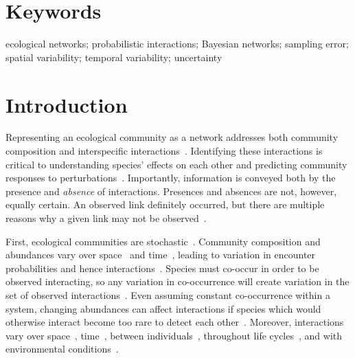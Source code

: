 \documentclass[12pt]{article}
\begin{document}
\begin{spacing}{2.0}
\section*{\small Keywords}

ecological networks; probabilistic interactions; Bayesian networks; sampling error; spatial variability; temporal variability; uncertainty

\linenumbers
\clearpage

\section*{Introduction}

    Representing an ecological community as a network addresses both community composition and interspecific interactions~\citep{Roslin2016}. Identifying these interactions is critical to understanding species' effects on each other and predicting community responses to perturbations~\citep{Bartomeus2016,Giron2018}. Importantly, information is conveyed both by the presence and \emph{absence} of interactions. Presences and absences are not, however, equally certain. An observed link definitely occurred, but there are multiple reasons why a given link may not be observed~\citep{Jordano2016}. 


    First, ecological communities are stochastic~\citep{Gotelli2000}. Community composition and abundances vary over space~\citep{Baiser2012} and time~\citep{Olesen2011a}, leading to variation in encounter probabilities and hence interactions~\citep{Vazquez2005,Poisot2015,Graham2018}. Species must co-occur in order to be observed interacting, so any variation in co-occurrence will create variation in the set of observed interactions~\citep{Gravel2018,Graham2018}. Even assuming constant co-occurrence within a system, changing abundances can affect interactions if species which would otherwise interact become too rare to detect each other~\citep{Tylianakis2010,Jordano2016}. Moreover, interactions vary over space~\citep{Kitching1987,Baiser2012}, time~\citep{Olesen2011a,Lopez2017}, between individuals~\citep{Pires2011a,Wells2013,Fodrie2015,Novak2015}, throughout life cycles~\citep{Clegg2018}, and with environmental conditions~\citep{Poisot2015}.



\end{spacing}
\end{document}
